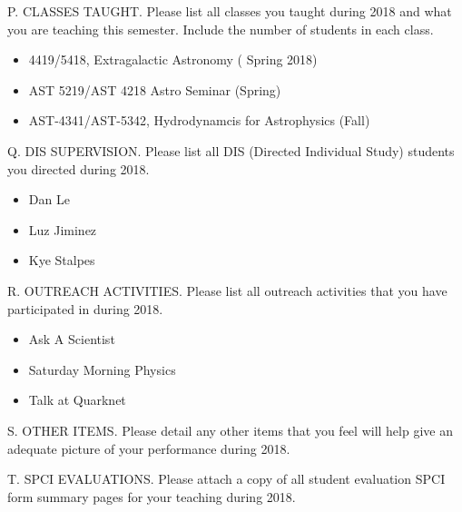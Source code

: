 \noindent P. CLASSES TAUGHT. Please list all classes you taught
during 2018 and what you are teaching this semester.  Include the
number of students in each class.

\begin{itemize}
\item 4419/5418, Extragalactic Astronomy ( Spring 2018) 
\item AST 5219/AST 4218 Astro Seminar (Spring)
\item AST-4341/AST-5342, Hydrodynamcis for Astrophysics (Fall)
\end{itemize}


\noindent Q. DIS SUPERVISION. Please list all DIS (Directed
Individual Study) students you directed during 2018.

\begin{itemize}
    \item Dan Le
    \item Luz Jiminez
    \item Kye Stalpes
\end{itemize}

\noindent R. OUTREACH ACTIVITIES. Please list all outreach
activities that you have participated in during 2018.

\begin{itemize}
    \item Ask A Scientist
    \item Saturday Morning Physics
    \item Talk at Quarknet
\end{itemize}

\noindent S. OTHER ITEMS. Please detail any other items that you
feel will help give an adequate picture of your performance during
2018.
\bigskip

\noindent T.  SPCI EVALUATIONS. Please attach a copy of all student
evaluation SPCI form summary pages for your teaching during 2018.






